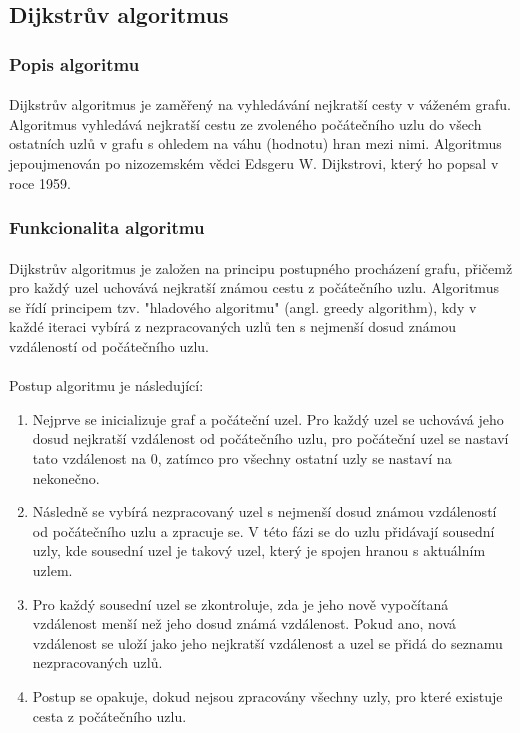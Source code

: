 \documentclass[12pt, titlepage, a4paper]{article}
\begin{document}
\subsection{Dijkstrův algoritmus}
\subsubsection{Popis algoritmu}
\paragraph{}
Dijkstrův algoritmus je zaměřený na vyhledávání nejkratší cesty v váženém grafu. Algoritmus 
vyhledává nejkratší cestu ze zvoleného počátečního uzlu do všech ostatních uzlů v grafu s 
ohledem na váhu (hodnotu) hran mezi nimi. Algoritmus jepoujmenován po nizozemském vědci 
Edsgeru W. Dijkstrovi, který ho popsal v roce 1959.

\subsubsection{Funkcionalita algoritmu}
\paragraph{}
Dijkstrův algoritmus je založen na principu postupného procházení grafu, přičemž pro každý 
uzel uchovává nejkratší známou cestu z počátečního uzlu. Algoritmus se řídí principem tzv. 
"hladového algoritmu" (angl. greedy algorithm), kdy v každé iteraci vybírá z nezpracovaných 
uzlů ten s nejmenší dosud známou vzdáleností od počátečního uzlu.
\paragraph{}
Postup algoritmu je následující:
\begin{enumerate}
    \item Nejprve se inicializuje graf a počáteční uzel. Pro každý uzel se uchovává jeho 
    dosud nejkratší vzdálenost od počátečního uzlu, pro počáteční uzel se nastaví tato 
    vzdálenost na 0, zatímco pro všechny ostatní uzly se nastaví na nekonečno.

    \item Následně se vybírá nezpracovaný uzel s nejmenší dosud známou vzdáleností od 
    počátečního uzlu a zpracuje se. V této fázi se do uzlu přidávají sousední uzly, kde 
    sousední uzel je takový uzel, který je spojen hranou s aktuálním uzlem.
    
    \item Pro každý sousední uzel se zkontroluje, zda je jeho nově vypočítaná vzdálenost 
    menší než jeho dosud známá vzdálenost. Pokud ano, nová vzdálenost se uloží jako jeho 
    nejkratší vzdálenost a uzel se přidá do seznamu nezpracovaných uzlů.
    
    \item Postup se opakuje, dokud nejsou zpracovány všechny uzly, pro které existuje 
    cesta z počátečního uzlu.
\end{enumerate}
\end{document}
